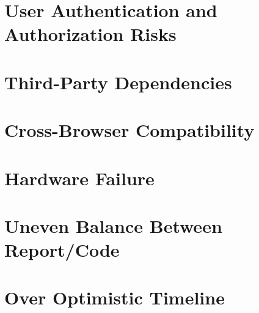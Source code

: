 \documentclass[]{project_report}
\begin{document}
\section{User Authentication and Authorization Risks}

\section{Third-Party Dependencies}

\section{Cross-Browser Compatibility}

\section{Hardware Failure}

\section{Uneven Balance Between Report/Code}

\section{Over Optimistic Timeline}

\newpage
\begin{thebibliography}{99}

\end{thebibliography}
\label{endpage}
\end{document}
